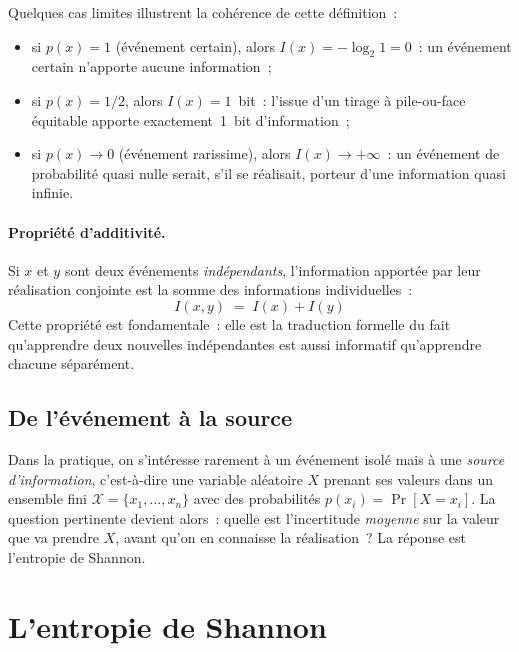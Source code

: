 Quelques cas limites illustrent la cohérence de cette définition~:
\begin{itemize}
  \item si $p(x) = 1$ (événement certain), alors $I(x) = -\log_2 1 = 0$~: un
        événement certain n'apporte aucune information~;
  \item si $p(x) = 1/2$, alors $I(x) = 1$~bit~: l'issue d'un tirage à pile-ou-face
        équitable apporte exactement~1~bit d'information~;
  \item si $p(x) \to 0$ (événement rarissime), alors $I(x) \to +\infty$~: un événement
        de probabilité quasi nulle serait, s'il se réalisait, porteur d'une
        information quasi infinie.
\end{itemize}

\paragraph{Propriété d'additivité.}
Si $x$ et $y$ sont deux événements \emph{indépendants}, l'information apportée
par leur réalisation conjointe est la somme des informations individuelles~:
\begin{equation}
  I(x,y) \;=\; I(x) + I(y)
  \label{eq:additivite}
\end{equation}
Cette propriété est fondamentale~: elle est la traduction formelle du fait qu'apprendre
deux nouvelles indépendantes est aussi informatif qu'apprendre chacune séparément.

\subsection{De l'événement à la source}

Dans la pratique, on s'intéresse rarement à un événement isolé mais à une
\emph{source d'information}, c'est-à-dire une variable aléatoire $X$ prenant ses
valeurs dans un ensemble fini $\mathcal{X} = \{x_1, \ldots, x_n\}$ avec des
probabilités $p(x_i) = \Pr[X = x_i]$. La question pertinente devient alors~:
quelle est l'incertitude \emph{moyenne} sur la valeur que va prendre $X$, avant
qu'on en connaisse la réalisation~? La réponse est l'entropie de Shannon.

\section{L'entropie de Shannon}
\label{sec:entropie}

